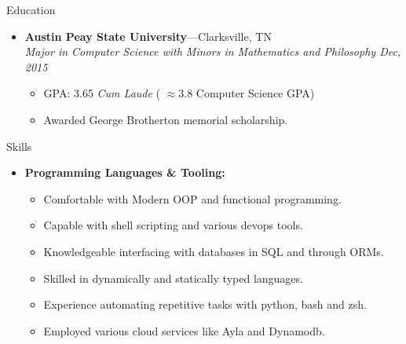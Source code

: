 \documentclass[11pt,oneside]{article}
\newenvironment{ressection}[1]{
	\vspace{4pt}
	{\fontfamily{phv}\selectfont\Large#1}
	\begin{itemize}
	\vspace{3pt}
}{
	\end{itemize}
}
\newcommand{\resitem}[1]{
	\vspace{-4pt}
	\item \begin{flushleft} #1 \end{flushleft}
}
\newcommand{\ressubitem}[1]{
	\vspace{-1pt}
	\item \begin{flushleft} #1 \end{flushleft}
}
\newcommand{\resbigitem}[3]{
	\vspace{-5pt}
	\item
	\textbf{#1}---#2 \\
	\textit{#3}
}
\newenvironment{ressubsec}[3]{
	\resbigitem{#1}{#2}{#3}
	\vspace{-2pt}
	\begin{itemize}
}{
	\end{itemize}
}
\newenvironment{reslist}[1]{
	\resitem{\textbf{#1}}
	\vspace{-5pt}
	\begin{itemize}
}{
	\end{itemize}
}
\begin{document}
\begin{ressection}{Education}

	\begin{ressubsec}{Austin Peay State University}{Clarksville, TN}{Major in Computer Science with Minors in Mathematics and Philosophy Dec, 2015}
		\ressubitem{GPA: 3.65 \textit{Cum Laude} ( $\approx 3.8$ Computer Science GPA)}
		\ressubitem{Awarded George Brotherton memorial scholarship.}
	\end{ressubsec}
\end{ressection}

\begin{ressection}{Skills}
	\begin{reslist}{Programming Languages \& Tooling:}
		\ressubitem{Comfortable with Modern OOP and functional programming.}
		\ressubitem{Capable with shell scripting and various devops tools.}
		\ressubitem{Knowledgeable interfacing with databases in SQL and through ORMs.}
		\ressubitem{Skilled in dynamically and statically typed languages. }
		\ressubitem{Experience automating repetitive tasks with python, bash and zsh.}
		\ressubitem{Employed various cloud services like Ayla and Dynamodb.}
\end{reslist}
\end{ressection}
\end{document}
